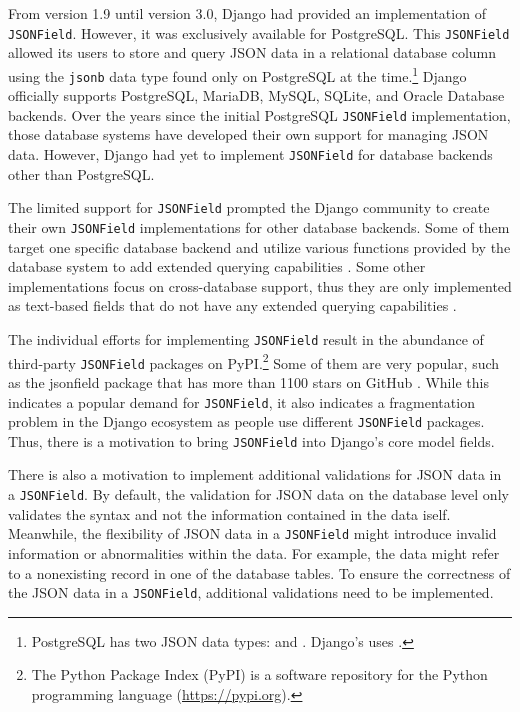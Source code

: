From version 1.9 until version 3.0, Django had provided an implementation of
\verb|JSONField|. However, it was exclusively available for PostgreSQL. This
\verb|JSONField| allowed its users to store and query JSON data in a relational
database column using the \verb|jsonb| data type found only on PostgreSQL at
the time.\footnote{PostgreSQL has two JSON data types:  and
. Django's  uses .} Django officially
supports PostgreSQL, MariaDB, MySQL, SQLite, and Oracle Database backends. Over
the years since the initial PostgreSQL \verb|JSONField| implementation, those
database systems have developed their own support for managing JSON data.
However, Django had yet to implement \verb|JSONField| for database backends
other than PostgreSQL.

The limited support for \verb|JSONField| prompted the Django community to
create their own \verb|JSONField| implementations for other database backends.
Some of them target one specific database backend and utilize various functions
provided by the database system to add extended querying capabilities
\cite{mysql_jsonfield, oracle_jsonfield}. Some other implementations
focus on cross-database support, thus they are only implemented as text-based
fields that do not have any extended querying capabilities
\cite{ryan_jsonfield}.

The individual efforts for implementing \verb|JSONField| result in the
abundance of third-party \verb|JSONField| packages on PyPI.\footnote{The Python
Package Index (PyPI) is a software repository for the Python programming
language (\mbox{\url{https://pypi.org}}).} Some of them are very popular, such as the
\mbox{jsonfield} package that has more than 1100 stars on GitHub
\cite{ryan_jsonfield}. While this indicates a popular demand for
\verb|JSONField|, it also indicates a fragmentation problem in the Django
ecosystem as people use different \verb|JSONField| packages. Thus, there is a
motivation to bring \verb|JSONField| into Django's core model fields.

There is also a motivation to implement additional validations for JSON data in
a \verb|JSONField|. By default, the validation for JSON data on the database
level only validates the syntax and not the information contained in the data
iself. Meanwhile, the flexibility of JSON data in a \verb|JSONField| might
introduce invalid information or abnormalities within the data. For example,
the data might refer to a nonexisting record in one of the database tables. To
ensure the correctness of the JSON data in a \verb|JSONField|, additional
validations need to be implemented.

